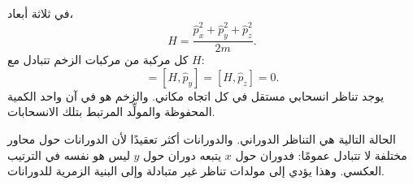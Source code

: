 في ثلاثة أبعاد،
\begin{equation}
H
=
\frac{\hat p_x^2+\hat p_y^2+\hat p_z^2}{2m}.
\end{equation}
كل مركبة من مركبات الزخم تتبادل مع \(H\):
\begin{equation}
[H,\hat p_x]=[H,\hat p_y]=[H,\hat p_z]=0.
\end{equation}
يوجد تناظر انسحابي مستقل في كل اتجاه مكاني. والزخم هو في آن واحد الكمية المحفوظة والمولِّد المرتبط بتلك الانسحابات.

الحالة التالية هي التناظر الدوراني. والدورانات أكثر تعقيدًا لأن الدورانات حول محاور مختلفة لا تتبادل عمومًا: فدوران حول \(x\) يتبعه دوران حول \(y\) ليس هو نفسه في الترتيب العكسي. وهذا يؤدي إلى مولدات تناظر غير متبادلة وإلى البنية الزمرية للدورانات.
